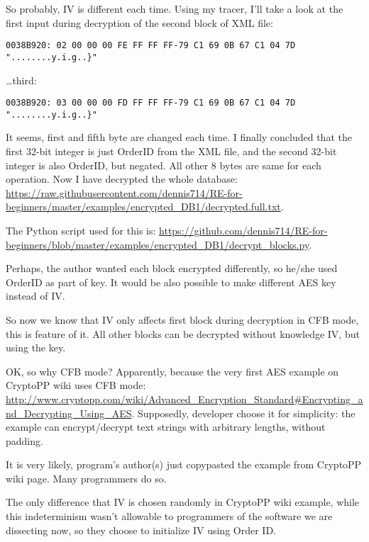 So probably, \ac{IV} is different each time.
Using my tracer, I'll take a look at the first input during decryption of the second block
of \ac{XML} file:

\begin{lstlisting}
0038B920: 02 00 00 00 FE FF FF FF-79 C1 69 0B 67 C1 04 7D "........y.i.g..}"
\end{lstlisting}

\dots third:

\begin{lstlisting}
0038B920: 03 00 00 00 FD FF FF FF-79 C1 69 0B 67 C1 04 7D "........y.i.g..}"
\end{lstlisting}

It seems, first and fifth byte are changed each time.
I finally concluded that the first 32-bit integer is just OrderID from the \ac{XML} file,
and the second 32-bit integer is also OrderID, but negated. All other 8 bytes are same for each operation.
Now I have decrypted the whole database:
\url{https://raw.githubusercontent.com/dennis714/RE-for-beginners/master/examples/encrypted_DB1/decrypted.full.txt}.

The Python script used for this is:
\url{https://github.com/dennis714/RE-for-beginners/blob/master/examples/encrypted_DB1/decrypt_blocks.py}.

Perhaps, the author wanted each block encrypted differently, so he/she used OrderID as part of key.
It would be also possible to make different AES key instead of \ac{IV}.

So now we know that \ac{IV} only affects first block during decryption in \ac{CFB} mode, this is
feature of it.
All other blocks can be decrypted without knowledge \ac{IV}, but using the key.

OK, so why \ac{CFB} mode? Apparently, because the very first AES example on CryptoPP wiki
uses \ac{CFB} mode:
\url{http://www.cryptopp.com/wiki/Advanced_Encryption_Standard#Encrypting_and_Decrypting_Using_AES}.
Supposedly, developer choose it for simplicity:
the example can encrypt/decrypt text strings with arbitrary lengths, without padding.

It is very likely, program's author(s) just copypasted the example from CryptoPP wiki page.
Many programmers do so.

The only difference that \ac{IV} is chosen randomly in CryptoPP wiki example, while this indeterminism
wasn't allowable to programmers of the software we are dissecting now,
so they choose to initialize \ac{IV} using Order ID.

